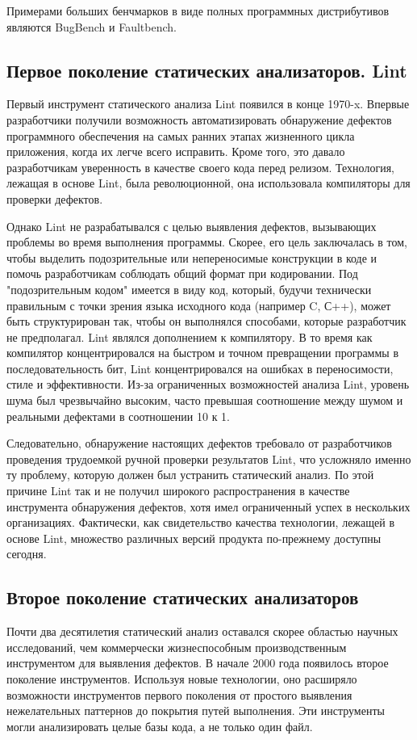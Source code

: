 Примерами больших бенчмарков в виде полных программных дистрибутивов являются BugBench\cite{BugBench} и Faultbench\cite{Faultbench}.

\subsection{Первое поколение статических анализаторов. Lint}

Первый инструмент статического анализа Lint\cite{Johnson78lint} появился в конце 1970-x. Впервые разработчики 
получили возможность автоматизировать обнаружение дефектов программного обеспечения на самых 
ранних этапах жизненного цикла приложения, когда их легче всего исправить. Кроме того, это 
давало разработчикам уверенность в качестве своего кода перед релизом. Технология, лежащая в 
основе Lint, была революционной, она использовала компиляторы для проверки дефектов. 

Однако Lint не разрабатывался с целью выявления дефектов, вызывающих проблемы во 
время выполнения программы. Скорее, его цель заключалась в том, чтобы выделить подозрительные 
или непереносимые конструкции в коде и помочь разработчикам соблюдать общий формат при 
кодировании. Под "подозрительным кодом" имеется в виду код, который, будучи технически правильным 
с точки зрения языка исходного кода (например C, С++), может быть структурирован так, чтобы он 
выполнялся способами, которые разработчик не предполагал. Lint являлся дополнением к компилятору. В то время как  компилятор концентрировался на быстром и точном превращении программы в последовательность бит, Lint концентрировался на ошибках в переносимости, стиле и эффективности.
Из-за ограниченных возможностей анализа Lint, уровень шума был чрезвычайно высоким, часто превышая соотношение между шумом и реальными дефектами в соотношении 10 к 1.

Следовательно, обнаружение настоящих дефектов требовало от разработчиков проведения трудоемкой 
ручной проверки результатов Lint, что усложняло именно ту проблему, которую должен был 
устранить статический анализ. По этой причине Lint так и не получил широкого распространения в 
качестве инструмента обнаружения дефектов, хотя имел ограниченный успех в нескольких 
организациях. Фактически, как свидетельство качества технологии, лежащей в основе Lint, 
множество различных версий продукта по-прежнему доступны сегодня. %

\subsection{Второе поколение статических анализаторов}
Почти два десятилетия статический анализ оставался скорее областью научных исследований, чем коммерчески 
жизнеспособным производственным инструментом для выявления дефектов. В начале 2000 года
появилось второе поколение инструментов. Используя новые 
технологии, оно расширяло возможности инструментов первого поколения от простого выявления 
нежелательных паттернов до покрытия путей выполнения. Эти инструменты могли анализировать 
целые базы кода, а не только один файл. 

